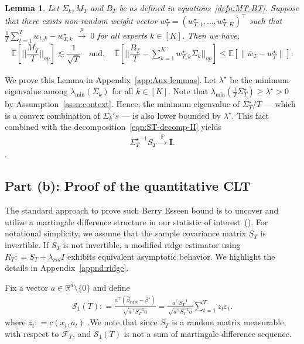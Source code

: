 \documentclass[11pt,letterpaper]{article}
\newcommand{\Prob}{\mathbb{P}}
\newcommand{\Exs}{\mathbb{E}}
\newcommand{\betaols}{\widehat{\beta}_{\mathrm{OLS}}}
\newcommand{\real}{\mathbb{R}}
\newcommand{\wstar}{w^\star}
\newcommand{\inprob}{\; \stackrel{p}{\rightarrow} \; }
\newcommand{\BT}{{\Sigma^\star_T}}
\newcommand{\Id}{\mathbf{I}}
\newcommand{\cfeat}{c}
\newcommand{\z}{z}
\newcommand{\fil}{\mathcal{F}}
\newcommand{\stao}{\mathcal{S}_1(T)}
\theoremstyle{plain}
\newtheorem{lemma}{Lemma}
\theoremstyle{definition}  %
\begin{document}
\begin{lemma}\label{lemma:MB-inprob}
    Let $\Sigma_k,M_T$ and $B_T$ be as defined in equations~\eqref{defn:MT-BT}. Suppose that there exists non-random weight vector $\wstar_T = (\wstar_{T,1}, \ldots , \wstar_{T,K})^\top$ such that $\frac{1}{T}\sum_{t = 1}^T w_{t,k}-\wstar_{T,k}  \inprob 0$ for all experts $k \in [K]$. Then we have,
    \begin{align}
        \Exs \left[\bigg| \bigg| \dfrac{M_T}{T} \bigg| \bigg|_{op} \right] \lesssim \dfrac{1}{\sqrt{T}} \quad \text{and}, \quad  \Exs \left[\bigg| \bigg| \dfrac{B_T}{T}-\sum^K_{k = 1} \wstar_{T,k} \Sigma_k \bigg| \bigg|_{op} \right] \leq \Exs[\|\bar{w}_T - w^\star_T \| ].
    \end{align}  
\end{lemma}

\noindent We prove this Lemma in Appendix~\ref{app:Aux-lemmas}. Let $\lambda^\star$ be the minimum eigenvalue among $\lambda_{\min}(\Sigma_k)$ for all $k\in [K]$. Note that $\lambda_{\min} \left(\frac{1}{T} \BT \right) \geq \lambda^\star > 0$ by Assumption~\ref{assn:context}. Hence, the minimum eigenvalue of $\Sigma_T^\star/T$ --- which is a convex combination of $\Sigma_k's$ --- is also lower bounded by $\lambda^\star$. This fact combined with the decomposition~\eqref{eqn:ST-decomp-II} yields 
%
\begin{align*}
    \BT^{-1}S_T \xrightarrow{\Prob} \Id.
\end{align*}.

\subsection*{Part (b): Proof of the quantitative CLT}




\noindent  The standard approach to prove such Berry Esseen bound is to uncover and utilize a martingale difference structure in our statistic of interest~(\citet{hall2014martingale}).  For notational simplicity, we assume that the sample covariance matrix $S_T$ is invertible. If $S_T$ is not invertible, a modified ridge estimator using $R_T: = S_T + \lambda_{rid} I$ exhibits equivalent asymptotic behavior. We highlight the details in Appendix~\ref{appnd:ridge}.

\noindent Fix a vector $a \in \real^d \setminus \{ 0\} $ and define 
\begin{align}\label{defn:stao}
   \stao : = \frac{a^{\top}  \left( \betaols - \beta^\star \right)}{ \sqrt{ a^{\top} S_T^{-1} a}} = \frac{a^{\top} S_T^{-1}}{ \sqrt{ a^{\top} S_T^{-1} a}} \sum^T_{t=1} \z_t  \varepsilon_t.
\end{align}
where $\z_t : = \cfeat(x_t, a_t)$ .We note that since $S_T$ is a random matrix measurable with respect to $\fil_T$, and $\stao$ is not a sum of martingale difference sequence. 
\end{document}

